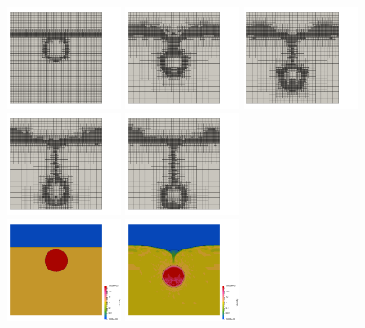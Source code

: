 \newpage
\begin{center}
\includegraphics[width=3.3cm]{images/stokes_sphere_fs2D/harm_6_1/grid0000}
\includegraphics[width=3.3cm]{images/stokes_sphere_fs2D/harm_6_1/grid0050}
\includegraphics[width=3.3cm]{images/stokes_sphere_fs2D/harm_6_1/grid0100}
\includegraphics[width=3.3cm]{images/stokes_sphere_fs2D/harm_6_1/grid0150}
\includegraphics[width=3.3cm]{images/stokes_sphere_fs2D/harm_6_1/grid0200}\\
\includegraphics[width=3.3cm]{images/stokes_sphere_fs2D/harm_6_1/eta0000}
\includegraphics[width=3.3cm]{images/stokes_sphere_fs2D/harm_6_1/eta0050}

\end{center}
